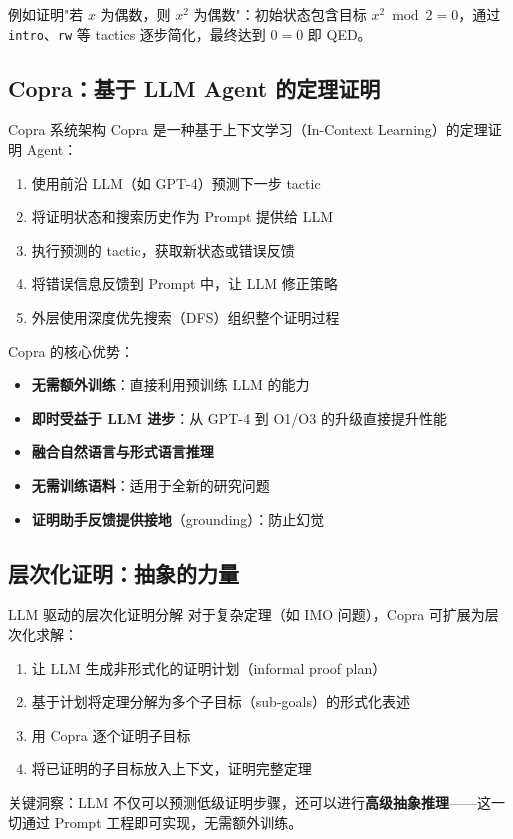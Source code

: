 例如证明"若 $x$ 为偶数，则 $x^2$ 为偶数"：初始状态包含目标 $x^2 \bmod 2 = 0$，通过 \texttt{intro}、\texttt{rw} 等 tactics 逐步简化，最终达到 $0 = 0$ 即 QED。

\subsection{Copra：基于 LLM Agent 的定理证明}

\begin{importantbox}{Copra 系统架构}
Copra 是一种基于上下文学习（In-Context Learning）的定理证明 Agent：
\begin{enumerate}
    \item 使用前沿 LLM（如 GPT-4）预测下一步 tactic
    \item 将证明状态和搜索历史作为 Prompt 提供给 LLM
    \item 执行预测的 tactic，获取新状态或错误反馈
    \item 将错误信息反馈到 Prompt 中，让 LLM 修正策略
    \item 外层使用深度优先搜索（DFS）组织整个证明过程
\end{enumerate}
\end{importantbox}

Copra 的核心优势：
\begin{itemize}
    \item \textbf{无需额外训练}：直接利用预训练 LLM 的能力
    \item \textbf{即时受益于 LLM 进步}：从 GPT-4 到 O1/O3 的升级直接提升性能
    \item \textbf{融合自然语言与形式语言推理}
    \item \textbf{无需训练语料}：适用于全新的研究问题
    \item \textbf{证明助手反馈提供接地}（grounding）：防止幻觉
\end{itemize}

\subsection{层次化证明：抽象的力量}

\begin{importantbox}{LLM 驱动的层次化证明分解}
对于复杂定理（如 IMO 问题），Copra 可扩展为层次化求解：
\begin{enumerate}
    \item 让 LLM 生成非形式化的证明计划（informal proof plan）
    \item 基于计划将定理分解为多个子目标（sub-goals）的形式化表述
    \item 用 Copra 逐个证明子目标
    \item 将已证明的子目标放入上下文，证明完整定理
\end{enumerate}
关键洞察：LLM 不仅可以预测低级证明步骤，还可以进行\textbf{高级抽象推理}——这一切通过 Prompt 工程即可实现，无需额外训练。
\end{importantbox}

